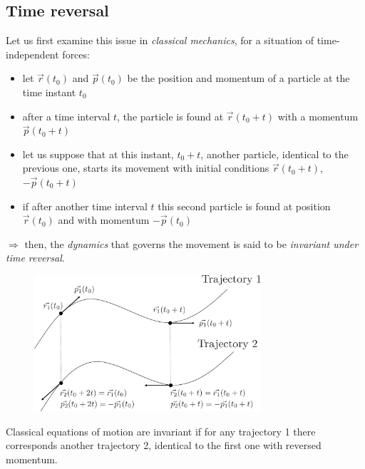 \documentclass[12pt]{article}
\begin{document}
\subsection{Time reversal}

Let us first examine this issue in \emph{classical
mechanics}, for a situation of time-independent
forces:
\begin{itemize}
\item let $\vec{r}\left(t_{0}\right)$ and $\vec{p}\left(t_{0}\right)$ be the position and
momentum of a particle at the time instant $t_0$
\item after a time interval $t$, the particle is found
at $\vec{r}\left(t_{0}+t\right)$ with a momentum $\vec{p}\left(t_{0}+t\right)$
\item let us suppose that at this instant, $t_0+t$,
another particle, identical to the previous one,
starts its movement with initial conditions
$\vec{r}\left(t_{0}+t\right)$, $-\vec{p}\left(t_{0}+t\right)$
%
\item if after another time interval $t$ this second
particle is found at position $\vec{r}\left(t_{0}\right)$ and
with momentum $-\vec{p}\left(t_{0}\right)$
\end{itemize}
$\Rightarrow$ then, the \emph{dynamics} that governs
the movement is said to be
\emph{invariant under time reversal}.

\begin{figure}[htbp]
\centering
\includegraphics[width=0.75\textwidth]{Figures/TimeReversal1-crop.pdf}
\end{figure}

Classical equations of motion are invariant if for
any trajectory 1 there corresponds another
trajectory 2, identical to the first one with
reversed momentum.
\end{document}
